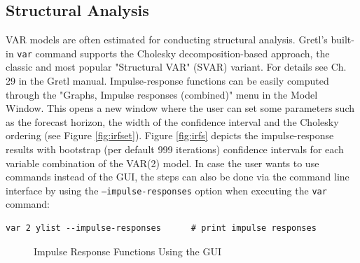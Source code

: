 \documentclass[11pt]{article}
\begin{document}
\subsection{Structural Analysis}
VAR models are often estimated for conducting structural analysis. Gretl’s built-in \texttt{var} command supports the Cholesky decomposition-based approach, the classic and most popular "Structural VAR" (SVAR) variant. For details see Ch. 29 in the Gretl manual. Impulse-response functions can be easily computed through the "Graphs, Impulse responses (combined)" menu in the Model Window. This opens a new window where the user can set some parameters such as the forecast horizon, the width of the confidence interval and the Cholesky ordering (see Figure \ref{fig:irfset}).
Figure \ref{fig:irfs} depicts the impulse-response results with bootstrap (per default 999 iterations) confidence intervals for each variable combination of the VAR(2) model. %
In case the user wants to use commands instead of the GUI, the steps can also be done via the command line interface by using the \texttt{---impulse-responses} option when executing the \texttt{var} command:
\begin{Verbatim}[baselinestretch=0.75, fontsize=\small]
var 2 ylist --impulse-responses      # print impulse responses
\end{Verbatim}


\begin{figure}[h!]
	\centering
	\caption{Impulse Response Functions Using the GUI}	
	\label{fig:IRF}
\end{figure}
\end{document}
